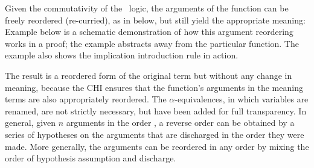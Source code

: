 \documentclass[output=paper,hidelinks]{langscibook}
\begin{document}
Given the commutativity of the \glue\ logic, the arguments of the
function can be freely reordered (re-curried), as in 
below, but still yield the appropriate meaning:
\ea\label{ex:semantics-2}
\z
%
Example  below is a schematic demonstration of how this argument reordering
works in a proof; the example abstracts away from the particular 
function. The example also shows the implication introduction rule in
action. 

\noindent
The result is a reordered form of the original term but without any
change in meaning, because the CHI ensures that the function's
arguments in the  meaning terms are
also appropriately reordered.  The $\alpha$-equivalences, in which variables are
renamed, are not strictly
necessary, but have been added for full transparency. In general, given $n$ arguments in the order
, a reverse order  can be obtained by a series of hypotheses on the
arguments that are discharged in the order they were made. More
generally, the arguments can be reordered in any order by mixing the
order of hypothesis assumption and discharge. 


\end{document}
